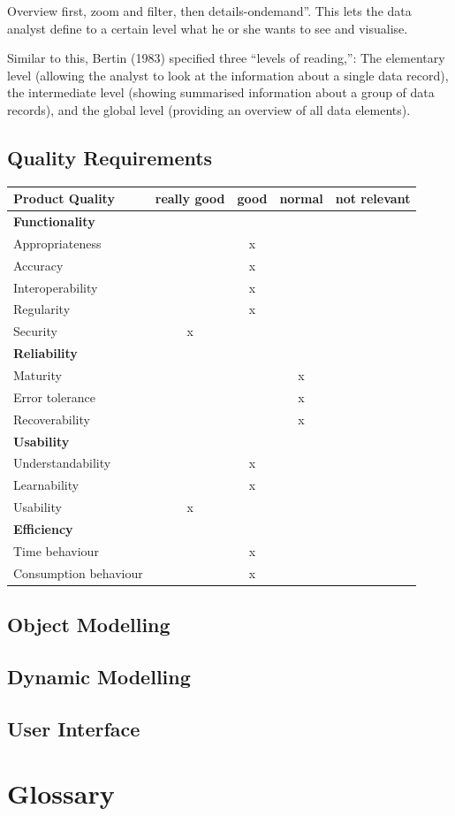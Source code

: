 \documentclass[twoside, english, draft]{Pflichtenheft}
\begin{document}
Overview first, zoom and filter, then details-ondemand”.
This lets the data analyst define to a certain level what he or she wants
to see and visualise. 

Similar to this, Bertin (1983) specified three “levels of reading,”:
The elementary level (allowing the analyst to look at the information about a
single data record), the intermediate level (showing summarised information about a group of data records), and the global level (providing an overview of all data elements).

\subsection{Quality Requirements}

\begin{tabular}{l*{3}{c}r}
Product Quality              & really good & good & normal & not relevant  \\
\hline
\textbf{Functionality} &  &  &  &    \\
Appropriateness & & x & & \\
Accuracy & & x & & \\
Interoperability & & x & & \\
Regularity & & x & & \\
Security & x&  & & \\
\textbf{Reliability} &  &  &  &    \\
Maturity & &  & x& \\
Error tolerance & &  &x & \\
Recoverability& &  & x & \\
\textbf{Usability} &  &  &  &    \\
Understandability & & x & & \\
Learnability & & x & & \\
Usability & x &  & & \\

\textbf{Efficiency} &  &  &  &    \\
Time behaviour & & x & & \\
Consumption behaviour & & x & & \\
\end{tabular}

\subsection{Object Modelling}
\subsection{Dynamic Modelling}
\subsection{User Interface}

\section{Glossary}
\printglossary[title=,toctitle=]



\printbibliography[heading=bibintoc]
\end{document}
